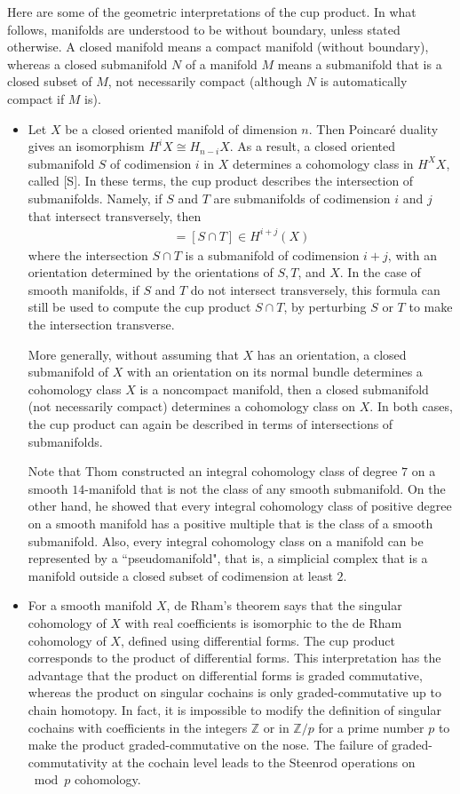   Here are some of the geometric interpretations of the cup product. In what follows, manifolds are understood to be without boundary, unless stated otherwise. A closed manifold means a compact manifold (without boundary), whereas a closed submanifold $N$ of a manifold $M$ means a submanifold that is a closed subset of $M$, not necessarily compact (although $N$ is automatically compact if $M$ is).
  \begin{itemize}
  \item Let $X$ be a closed oriented manifold of dimension $n$. Then Poincaré duality gives an isomorphism $H^i X \cong H_{n-i} X$. As a result, a closed oriented submanifold $S$ of codimension $i$ in $X$ determines a cohomology class in $H^X X$, called [S]. In these terms, the cup product describes the intersection of submanifolds. Namely, if $S$ and $T$ are submanifolds of codimension $i$ and $j$ that intersect transversely, then
  \begin{align*}
  [S][T]=[S \cap T] \in H^{i+j}(X)
  \end{align*}
  where the intersection $S \cap T$ is a submanifold of codimension $i+j$, with an orientation determined by the orientations of $S, T$, and $X$. In the case of smooth manifolds, if $S$ and $T$ do not intersect transversely, this formula can still be used to compute the cup product $S\cap T$, by perturbing $S$ or $T$ to make the intersection transverse.
  
  More generally, without assuming that $X$ has an orientation, a closed submanifold of $X$ with an orientation on its normal bundle determines a cohomology class $X$ is a noncompact manifold, then a closed submanifold (not necessarily compact) determines a cohomology class on $X$. In both cases, the cup product can again be described in terms of intersections of submanifolds.
  
  Note that Thom constructed an integral cohomology class of degree $7$ on a smooth $14$-manifold that is not the class of any smooth submanifold. On the other hand, he showed that every integral cohomology class of positive degree on a smooth manifold has a positive multiple that is the class of a smooth submanifold. Also, every integral cohomology class on a manifold can be represented by a ``pseudomanifold", that is, a simplicial complex that is a manifold outside a closed subset of codimension at least $2$.
  \item For a smooth manifold $X$, de Rham's theorem says that the singular cohomology of $X$ with real coefficients is isomorphic to the de Rham cohomology of $X$, defined using differential forms. The cup product corresponds to the product of differential forms. This interpretation has the advantage that the product on differential forms is graded commutative, whereas the product on singular cochains is only graded-commutative up to chain homotopy. In fact, it is impossible to modify the definition of singular cochains with coefficients in the integers $\mathbb{Z}$ or in $\mathbb{Z} / p$ for a prime number $p$ to make the product graded-commutative on the nose. The failure of graded-commutativity at the cochain level leads to the Steenrod operations on $\bmod p$ cohomology.
\end{itemize}


